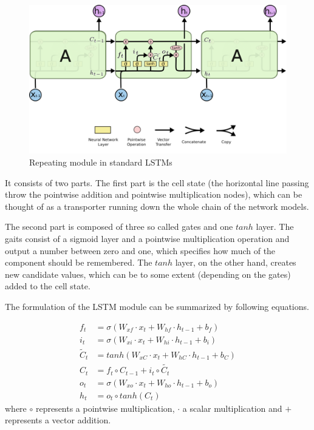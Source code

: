 \begin{figure}[h!]
    \centering
    \includegraphics[scale=0.7]{figures/LSTM3-chain.png}
    \caption{Repeating module in standard LSTMs \cite{LSTM_blog}}
    \label{fig:lstm_modes_schema}
\end{figure}


It consists of two parts. The first part is the cell state (the horizontal line passing throw the pointwise addition and pointwise multiplication nodes), which can be thought of as a transporter running down the whole chain of the network models. 

The second part is composed of three so called gates and one $tanh$ layer. The gaits consist of a sigmoid layer and a pointwise multiplication operation and output a number between zero and one, which specifies how much of the component should be remembered. The $tanh$ layer, on the other hand, creates new candidate values, which can be to some extent (depending on the gates) added to the cell state.

The formulation of the LSTM module can be summarized by following equations.

\begin{align}
    f_t &=\sigma(W_{xf}\cdot x_t + W_{hf}\cdot h_{t-1} +b_f)\\
    i_t &=\sigma(W_{xi} \cdot x_t + W_{hi} \cdot h_{t-1} +b_i)\\
    \widetilde{C}_t&=tanh(W_{xC}\cdot x_t + W_{hC} \cdot h_{t-1} +b_C)\\
    C_t&=f_t\circ C_{t-1}+i_t\circ \widetilde{C_t}\\
    o_t&=\sigma(W_{xo} \cdot x_t + W_{ho} \cdot h_{t-1} +b_o)\\
    h_t&=o_t\circ tanh(C_t)
\end{align}
where $\circ$ represents a pointwise multiplication, $\cdot$ a scalar multiplication and $+$ represents a vector addition.

